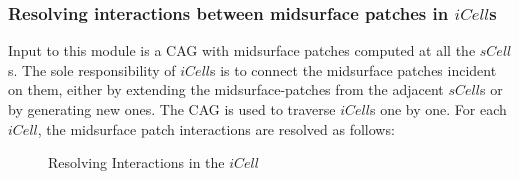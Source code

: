 	



\subsubsection{Resolving interactions between midsurface patches in $iCell$s}
\label{sec:icell}
Input to this module is a CAG with midsurface patches computed at all the $sCell$s. The sole responsibility of $iCell$s is to connect the midsurface patches incident on them, either by extending the midsurface-patches from the adjacent $sCell$s or by generating new ones.  The CAG is used to traverse $iCell$s one by one. For each $iCell$, the midsurface patch interactions are resolved as follows:
	\begin{figure}[!h]
	\centering     %
	\caption{Resolving Interactions in the $iCell$}
	\label{fig_resolveiCell}
	\end{figure}
